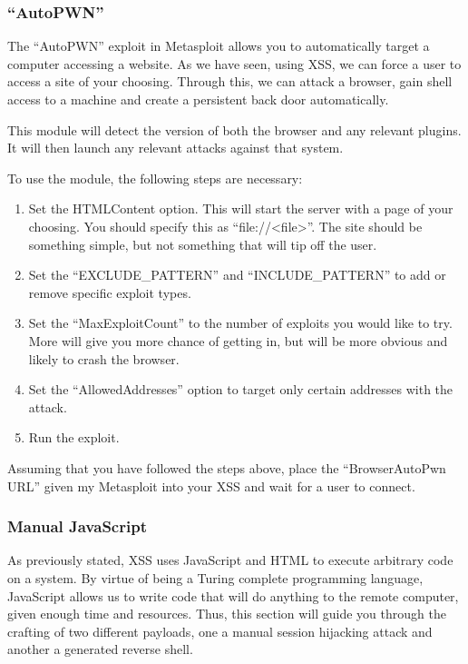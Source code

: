 			\subsubsection{``AutoPWN''}
				The ``AutoPWN'' exploit in Metasploit allows you to automatically target a computer accessing a website. 
				As we have seen, using XSS, we can force a user to access a site of your choosing. 
				Through this, we can attack a browser, gain shell access to a machine and create a persistent back door automatically. 
	
				This module will detect the version of both the browser and any relevant plugins. 
				It will then launch any relevant attacks against that system. 
	
				To use the module, the following steps are necessary:
				\begin{enumerate}
					\item Set the HTMLContent option. 
						This will start the server with a page of your choosing. 
						You should specify this as ``file://<file>''.
						The site should be something simple, but not something that will tip off the user. 
					\item Set the ``EXCLUDE\_PATTERN'' and ``INCLUDE\_PATTERN'' to add or remove specific exploit types. 
					\item Set the ``MaxExploitCount'' to the number of exploits you would like to try. 
						More will give you more chance of getting in, but will be more obvious and likely to crash the browser. 
					\item Set the ``AllowedAddresses'' option to target only certain addresses with the attack. 
					\item Run the exploit. 
				\end{enumerate}

				Assuming that you have followed the steps above, place the ``BrowserAutoPwn URL'' given my Metasploit into your XSS and wait for a user to connect. 


			\subsubsection{Manual JavaScript}
				As previously stated, XSS uses JavaScript and HTML to execute arbitrary code on a system. 
				By virtue of being a Turing complete programming language, JavaScript allows us to write code that will do anything to the remote computer, given enough time and resources. 
				Thus, this section will guide you through the crafting of two different payloads, one a manual session hijacking attack and another a generated reverse shell. 


